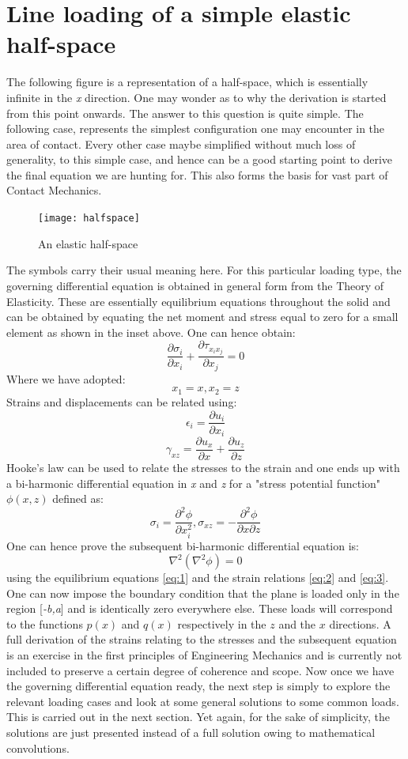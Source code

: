 \documentclass{article}
\begin{document}
\section{Line loading of a simple elastic half-space}
The following figure is a representation of a half-space, which is essentially infinite in the \textit{x} direction. One may wonder as to why the derivation is started from this point onwards. The answer to this question is quite simple. The following case, represents the simplest configuration one may encounter in the area of contact. Every other case maybe simplified without much loss of generality, to this simple case, and hence can be a good starting point to derive the final equation we are hunting for. This also forms the basis for vast part of Contact Mechanics.   
\begin{figure}[h]
 \centering
 \texttt{[image: halfspace]}
 \caption{An elastic half-space}
 \label{Figure 1:}
\end{figure} 
The symbols carry their usual meaning here. For this particular loading type, the governing differential equation is obtained in general form from the Theory of Elasticity. These are essentially equilibrium equations throughout the solid and can be obtained by equating the net moment and stress equal to zero for a small element as shown in the inset above. One can hence obtain:
\[
\frac{\partial \sigma_i}{\partial x_i} + \frac{\partial \tau_{x_i x_j}}{\partial x_j}=0 \tag{1} \label{eq:1}
\]
Where we have adopted: 
\[
x_1 = x, x_2 = z \tag{1.a} 
\]
Strains and displacements can be related using: 
\[
\epsilon_i = \frac{\partial u_i}{\partial x_i} \tag{2} \label{eq:2}
\]
\[
\gamma_{xz} = \frac{\partial u_x}{\partial x} + \frac{\partial u_z}{\partial z} \tag{3} \label{eq:3}
\]
Hooke's law can be used to relate the stresses to the strain  and one ends up with a bi-harmonic differential equation in \textit{x} and \textit{z} for a "stress potential function" $\phi(x,z)$ defined as: 
\[
\sigma_i = \frac{\partial^2 \phi}{\partial x_i^2}, \sigma_{xz} = -\frac{\partial^2 \phi}{\partial x \partial z} \tag{4} \label{eq:4}
\]
One can hence prove the subsequent bi-harmonic differential equation is:
\[
\nabla^2(\nabla^2 \phi) = 0 \tag{5} \label{eq:5}
\]
using the equilibrium equations \eqref{eq:1} and the strain relations \eqref{eq:2} and \eqref{eq:3}. One can now impose the boundary condition that the plane is loaded only in the region [\textit{-b,a}] and is identically zero everywhere else. These loads will correspond to the functions $p(x)$ and $q(x)$ respectively in the $z$ and the $x$ directions. A full derivation of the strains relating to the stresses and the subsequent equation is an exercise in the first principles of Engineering Mechanics and is currently  not included to preserve a certain degree of coherence and scope. Now once we have the governing differential equation ready, the next step is simply to explore the relevant loading cases and look at some general solutions to some common loads. This is carried out in the next section. Yet again, for the sake of simplicity, the solutions are just presented instead of a full solution owing to mathematical convolutions.
\end{document}
